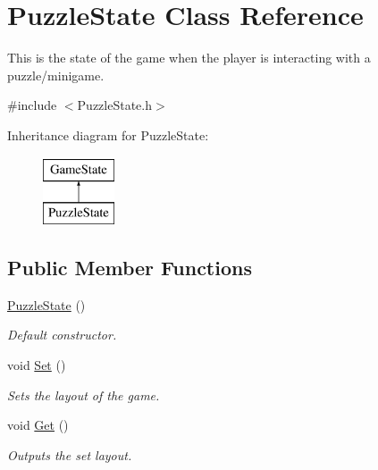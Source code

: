 \hypertarget{classPuzzleState}{\section{Puzzle\-State Class Reference}
\label{classPuzzleState}
}


This is the state of the game when the player is interacting with a puzzle/minigame.  




{\ttfamily \#include $<$Puzzle\-State.\-h$>$}

Inheritance diagram for Puzzle\-State\-:\begin{figure}[H]
\begin{center}
\leavevmode
\includegraphics[height=2.000000cm]{classPuzzleState}
\end{center}
\end{figure}
\subsection*{Public Member Functions}
\begin{DoxyCompactItemize}
\item 
\hypertarget{classPuzzleState_a441deecdaf8b7ff103933664ff476870}{\hyperlink{classPuzzleState_a441deecdaf8b7ff103933664ff476870}{Puzzle\-State} ()}\label{classPuzzleState_a441deecdaf8b7ff103933664ff476870}

\begin{DoxyCompactList}\small\item\em Default constructor. \end{DoxyCompactList}\item 
\hypertarget{classPuzzleState_a966b0f168ff5499f247c9ab519b524ab}{void \hyperlink{classPuzzleState_a966b0f168ff5499f247c9ab519b524ab}{Set} ()}\label{classPuzzleState_a966b0f168ff5499f247c9ab519b524ab}

\begin{DoxyCompactList}\small\item\em Sets the layout of the game. \end{DoxyCompactList}\item 
\hypertarget{classPuzzleState_ac9f6dd77d6471165d9eb2c18bd051dd1}{void \hyperlink{classPuzzleState_ac9f6dd77d6471165d9eb2c18bd051dd1}{Get} ()}\label{classPuzzleState_ac9f6dd77d6471165d9eb2c18bd051dd1}

\begin{DoxyCompactList}\small\item\em Outputs the set layout. \end{DoxyCompactList}\end{DoxyCompactItemize}
